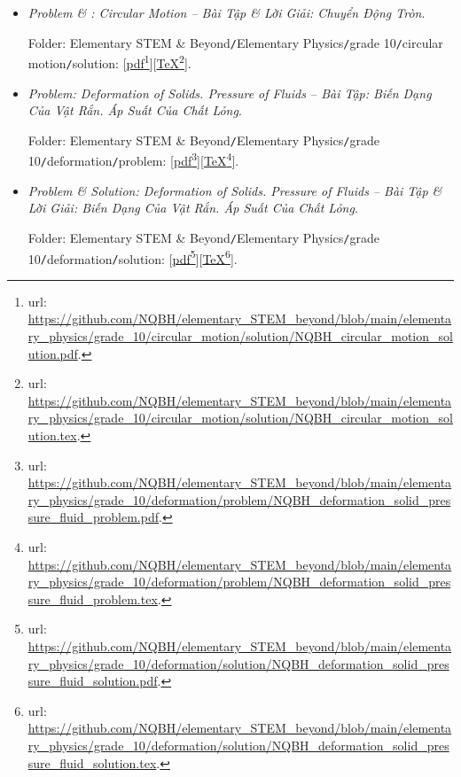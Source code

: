 \documentclass[12pt]{article}
\begin{document}
\begin{itemize}
	\item {\it Problem \& : Circular Motion -- Bài Tập \& Lời Giải: Chuyển Động Tròn}.
	
	Folder: {\sf Elementary STEM \& Beyond{\tt/}Elementary Physics{\tt/}grade 10{\tt/}circular motion{\tt/}solution}: [\href{https://github.com/NQBH/elementary_STEM_beyond/blob/main/elementary_physics/grade_10/circular_motion/solution/NQBH_circular_motion_solution.pdf}{pdf}\footnote{{\sc url}: \url{https://github.com/NQBH/elementary_STEM_beyond/blob/main/elementary_physics/grade_10/circular_motion/solution/NQBH_circular_motion_solution.pdf}.}][\href{https://github.com/NQBH/elementary_STEM_beyond/blob/main/elementary_physics/grade_10/circular_motion/solution/NQBH_circular_motion_solution.tex}{\TeX}\footnote{{\sc url}: \url{https://github.com/NQBH/elementary_STEM_beyond/blob/main/elementary_physics/grade_10/circular_motion/solution/NQBH_circular_motion_solution.tex}.}].
	\item {\it Problem: Deformation of Solids. Pressure of Fluids -- Bài Tập: Biến Dạng Của Vật Rắn. Áp Suất Của Chất Lỏng}.
	
	Folder: {\sf Elementary STEM \& Beyond{\tt/}Elementary Physics{\tt/}grade 10{\tt/}deformation{\tt/}problem}: [\href{https://github.com/NQBH/elementary_STEM_beyond/blob/main/elementary_physics/grade_10/deformation/problem/NQBH_deformation_solid_pressure_fluid_problem.pdf}{pdf}\footnote{{\sc url}: \url{https://github.com/NQBH/elementary_STEM_beyond/blob/main/elementary_physics/grade_10/deformation/problem/NQBH_deformation_solid_pressure_fluid_problem.pdf}.}][\href{https://github.com/NQBH/elementary_STEM_beyond/blob/main/elementary_physics/grade_10/deformation/problem/NQBH_deformation_solid_pressure_fluid_problem.tex}{\TeX}\footnote{{\sc url}: \url{https://github.com/NQBH/elementary_STEM_beyond/blob/main/elementary_physics/grade_10/deformation/problem/NQBH_deformation_solid_pressure_fluid_problem.tex}.}].
	
	\item {\it Problem \& Solution: Deformation of Solids. Pressure of Fluids -- Bài Tập \& Lời Giải: Biến Dạng Của Vật Rắn. Áp Suất Của Chất Lỏng}.
	
	Folder: {\sf Elementary STEM \& Beyond{\tt/}Elementary Physics{\tt/}grade 10{\tt/}deformation{\tt/}solution}: [\href{https://github.com/NQBH/elementary_STEM_beyond/blob/main/elementary_physics/grade_10/deformation/solution/NQBH_deformation_solid_pressure_fluid_solution.pdf}{pdf}\footnote{{\sc url}: \url{https://github.com/NQBH/elementary_STEM_beyond/blob/main/elementary_physics/grade_10/deformation/solution/NQBH_deformation_solid_pressure_fluid_solution.pdf}.}][\href{https://github.com/NQBH/elementary_STEM_beyond/blob/main/elementary_physics/grade_10/deformation/solution/NQBH_deformation_solid_pressure_fluid_solution.tex}{\TeX}\footnote{{\sc url}: \url{https://github.com/NQBH/elementary_STEM_beyond/blob/main/elementary_physics/grade_10/deformation/solution/NQBH_deformation_solid_pressure_fluid_solution.tex}.}].
\end{itemize}
\end{document}

